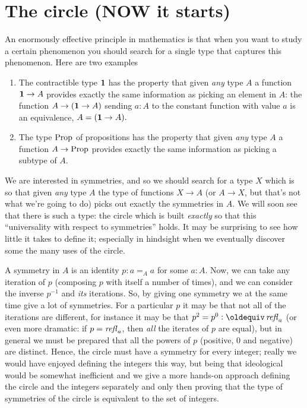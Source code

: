 \section{The circle (NOW it starts)}
\label{sec:sec:circle}
An enormously effective principle in mathematics is that when you want to study a certain phenomenon you should search for a single type that captures this phenomenon.  Here are two examples
\begin{enumerate}
\item The contractible type $\mathbf{1}$ has the property that given \emph{any} type $A$ a function $\mathbf{1}\to A$ provides exactly the same information as picking an element in $A$: the function $A\to (\mathbf{1}\to A)$ sending $a:A$ to the constant function with value $a$ is an equivalence, \ie 
$A=(\mathbf{1}\to A).$
\item The type $\mathrm{Prop}$ of propositions has the property that given \emph{any} type $A$ a function $A\to\mathrm{Prop}$ provides exactly the same information as picking a subtype of $A$.
\end{enumerate}
We are interested in symmetries, and so we should search for a type $X$ which is so that given \emph{any} type $A$ the type of functions $X\to A$ (or $A\to X$, but that's not what we're going to do) picks out exactly the symmetries in $A$.  We will soon see that there is such a type: the circle which is built \emph{exactly} so that this ``universality with respect to symmetries'' holds.  It may be surprising to see how little it takes to define it; especially in hindsight when we eventually discover some the many uses of the circle.

A symmetry in $A$ is an identity $p:a=_Aa$ for some $a:A$.  Now, we can take any iteration of $p$ (composing $p$ with itself a number of times), and we can consider the inverse $p^{-1}$ and \emph{its} iterations.  So, by giving one symmetry we at the same time give a lot of symmetries.  For a particular $p$ it may be that not all of the iterations are different, for instance it may be that $p^2=p^0\defequi\refl a$ (or even more dramatic: if  $p=\mathop{{\it refl}_{a}}$, then \emph{all} the iterates of $p$ are equal), but in general we must be prepared that all the powers of $p$ (positive, $0$ and negative) are distinct.  Hence, the circle must have a symmetry for every integer; really we would have enjoyed defining the integers this way, but being that ideological would be somewhat inefficient and we give a more hands-on approach defining the circle and the integers separately and only then proving that the type of symmetries of the circle is equivalent to the set of integers. 

